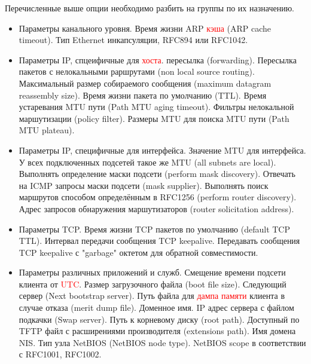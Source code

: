 \documentclass[14pt]{extarticle}
\begin{document}
Перечисленные выше опции необходимо разбить на группы по их назначению.

\begin{itemize}
    \item Параметры канального уровня.
        \subitem Время жизни ARP \textcolor{red}{кэша} (ARP cache timeout).
        \subitem Тип Ethernet инкапсуляции, RFC894 или RFC1042.
    \item Параметры IP, спцеифичные для \textcolor{red}{хоста}.
        \subitem пересылка (forwarding).
        \subitem Пересылка пакетов с нелокальными раршрутами (non local source routing).
        \subitem Максимальный размер собираемого сообщения (maximum datagram reassembly size).
        \subitem Время жизни пакета по умолчанию (TTL).
        \subitem Время устаревания MTU пути (Path MTU aging timeout).
        \subitem Фильтры нелокальной маршутизации (policy filter).
        \subitem Размеры MTU для поиска MTU пути (Path MTU plateau).
    \item Параметры IP, специфичные для интерфейса.
        \subitem Значение MTU для интерфейса.
        \subitem У всех подключенных подсетей такое же MTU (all subnets are local).
        \subitem Выполнять определение маски подсети (perform mask discovery).
        \subitem Отвечать на ICMP запросы маски подсети (mask supplier).
        \subitem Выполнять поиск маршрутов способом определённым в RFC1256 (perform router discovery).
        \subitem Адрес запросов обнаружения маршутизаторов (router solicitation address).
    \item Параметры TCP.
        \subitem Время жизни TCP пакетов по умолчанию (default TCP TTL).
        \subitem Интервал передачи сообщения TCP keepalive.
        \subitem Передавать сообщения TCP keepalive с "garbage" октетом для обратной совместимости.
    \item Параметры различных приложений и служб.
        \subitem Смещение времени подсети клиента от \textcolor{red}{UTC}.
        \subitem Размер загрузочного файла (boot file size).
        \subitem Следующий сервер (Next bootstrap server).
        \subitem Путь файла для \textcolor{red}{дампа памяти} клиента в случае отказа (merit dump file).
        \subitem Доменное имя.
        \subitem IP адрес сервера с файлом подкачки (Swap server).
        \subitem Путь к корневому диску (root path).
        \subitem Доступный по TFTP файл с расширениями производителя (extensions path).
        \subitem Имя домена NIS.
        \subitem Тип узла NetBIOS (NetBIOS node type).
        \subitem NetBIOS scope в соответствии с RFC1001, RFC1002.

\end{itemize}
\end{document}
